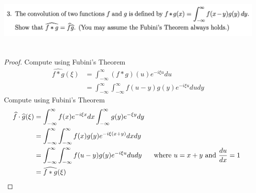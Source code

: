 \documentclass{report}
\begin{document}
\begin{question}{}{}
\includegraphics[height=3cm,width=18cm]{hw3q3}
\end{question}
\begin{proof}
Compute using Fubini's Theorem
\begin{align*}
  \widehat{f*g}(\xi)&=\int_{-\infty}^{\infty}(f*g)(u)e^{-i\xi u}du\\
  &=\int_{-\infty}^{\infty}\int_{-\infty}^{\infty}f(u-y)g(y)e^{-i\xi u}dudy
\end{align*}
Compute using Fubini's Theorem 
\begin{align*}
\widehat{f}\cdot \widehat{g}(\xi)&=\int_{-\infty}^{\infty}f(x)e^{-i\xi x}dx\int_{-\infty}^{\infty}g(y)e^{-\xi y}dy\\
&=\int_{-\infty}^{\infty}\int_{-\infty}^{\infty}f(x)g(y)e^{-i\xi (x+y)}dxdy\\
  &=\int_{-\infty}^{\infty}\int_{-\infty}^{\infty}f(u-y)g(y)e^{-i\xi u}dudy\hspace{0.5cm}\text{ where $u=x+y$ and  $\frac{du}{dx}=1$ }\\
  &=\widehat{f*g}(\xi)
\end{align*}
\end{proof}
\end{document}
